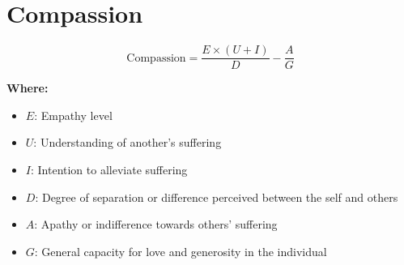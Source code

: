 \chapter{Compassion}

\begin{equation}
\text{Compassion} = \frac{E \times (U + I)}{D} - \frac{A}{G}
\end{equation}

\textbf{Where:}

\begin{itemize}
    \item $E$: Empathy level
    \item $U$: Understanding of another's suffering
    \item $I$: Intention to alleviate suffering
    \item $D$: Degree of separation or difference perceived between the self and others
    \item $A$: Apathy or indifference towards others' suffering
    \item $G$: General capacity for love and generosity in the individual
\end{itemize}